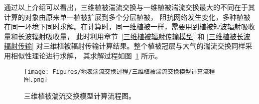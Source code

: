 通过以上介绍可以看出，三维植被湍流交换与一维植被湍流交换最大的不同在于其计算的对象由原来单一植被扩展到多个分层植被，
阻抗网络发生变化，多种植被在同一环境下同时求解。在计算时，同一维植被一样，需要用到植被短波辐射吸收量和长波辐射吸收量，
此时利用章节~\ref{三维植被辐射传输模型} 和 \ref{三维植被长波辐射传输} 对三维植被辐射传输计算结果。整个植被冠层与大气的湍流交换同样采用相似性理论进行求解，
其求解过程如图~\ref{fig:三维植被湍流交换模型计算流程图} 所示。
{
\begin{figure}[]
\centering
\texttt{[image: Figures/地表湍流交换过程/三维植被湍流交换模型计算流程图.png]}
\caption{三维植被湍流交换模型计算流程图。}
\label{fig:三维植被湍流交换模型计算流程图}
\end{figure}
}
